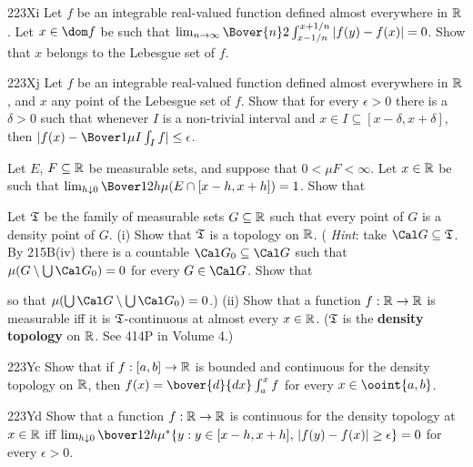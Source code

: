 {\spheader 223Xi Let $f$ be an integrable real-valued function defined
almost everywhere in $\Bbb R$.   Let $x\in\dom f$ be such that
$\lim_{n\to\infty}\Bover{n}2\int^{x+1/n}_{x-1/n}|f(y)-f(x)|=0$.   Show
that $x$ belongs to the Lebesgue set of $f$.
     
\spheader 223Xj Let $f$ be an integrable real-valued function defined
almost everywhere in $\Bbb R$, and $x$ any point of the Lebesgue set of
$f$.   Show
that for every $\epsilon>0$ there is a $\delta>0$ such that whenever $I$
is a non-trivial interval and $x\in I\subseteq[x-\delta,x+\delta]$, then
$|f(x)-\Bover1{\mu I}\int_If|\le\epsilon$.
     
 Let $E$, $F\subseteq\Bbb R$ be
measurable sets, and suppose that $0<\mu F<\infty$.   Let $x\in\Bbb R$
be such that $\lim_{h\downarrow 0}\Bover1{2h}\mu(E\cap[x-h,x+h])=1$.
Show that
     
     
\noindent {}
     
 Let $\frak T$ be the family of measurable sets
$G\subseteq\Bbb R$ such that every point of $G$ is a density point of
$G$.   {(i)} Show that $\frak T$ is a topology on $\Bbb R$.   ({\it
Hint\/}: take $\Cal G\subseteq\frak T$.   By 215B(iv) there is a
countable
$\Cal G_0\subseteq\Cal G$ such that $\mu(G\setminus\bigcup\Cal G_0)=0$
for every $G\in\Cal G$.   Show that
     
     
\noindent so that $\mu(\bigcup\Cal G\setminus\bigcup\Cal G_0)=0$.)   {(ii)} Show that a function
$f:\Bbb R\to\Bbb R$ is measurable iff it is $\frak T$-continuous at
almost every $x\in\Bbb R$.   ($\frak T$ is the {\bf density topology} on
$\Bbb R$.   See 414P in Volume 4.)
     
\spheader 223Yc Show that if $f:[a,b]\to\Bbb R$ is bounded and
continuous for the density topology on $\Bbb R$, then
$f(x)=\bover{d}{dx}\int_a^xf$ for every $x\in\ooint{a,b}$.
     
\spheader 223Yd Show that a function $f:\Bbb R\to\Bbb R$ is continuous
for the density topology at $x\in\Bbb R$ iff 
$\lim_{h\downarrow 0}\bover1{2h}
  \mu^*\{y:y\in[x-h,x+h],\,|f(y)-f(x)|\ge\epsilon\}=0$ for
every $\epsilon>0$.
     
}
